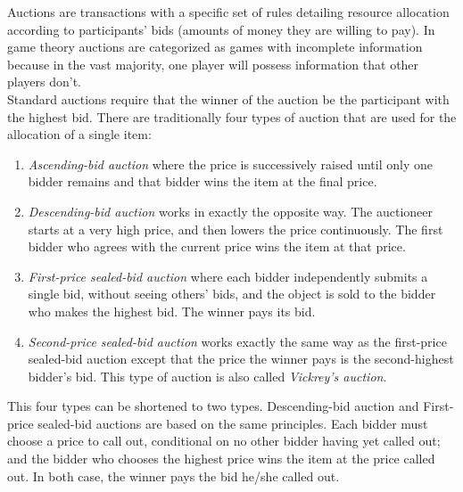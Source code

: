 \documentclass[12pt]{article}
\begin{document}
Auctions are transactions with a specific set of rules detailing resource allocation according to participants' bids (amounts of money they are willing to pay). In game theory auctions are categorized as games with incomplete information because in the vast majority, one player will possess information that other players don't. \\
Standard auctions require that the winner of the auction be the participant with the highest bid. There are traditionally four types of auction that are used for the allocation of a single item: 
\begin{enumerate}
\item \emph{Ascending-bid auction} where the price is successively raised until only one
bidder remains and that bidder wins the item at the final price. 
\item \emph{Descending-bid auction} works in exactly the opposite way. The auctioneer
starts at a very high price, and then lowers the price continuously. The first bidder
who agrees with the current price wins the item at that price. 
\item \emph{First-price sealed-bid auction} where each bidder independently submits a
single bid, without seeing others’ bids, and the object is sold to the bidder who
makes the highest bid. The winner pays its bid.
\item \emph{Second-price sealed-bid auction} works exactly the same way as the first-price sealed-bid auction except that the price the winner pays is the second-highest bidder’s bid. This type of auction is also called \emph{Vickrey's auction}.
\end{enumerate} 
This four types can be shortened to two types. Descending-bid auction and First-price sealed-bid auctions are based on the same principles. Each bidder must choose a price to call out, conditional on no other bidder having yet called out; and the bidder who chooses the highest price wins the item at the price called out. In both case, the winner pays the bid he/she called out.
\end{document}
